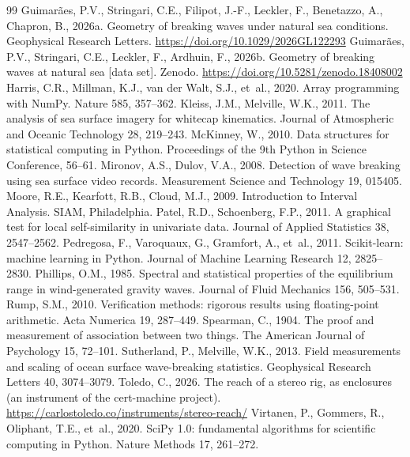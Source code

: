 \documentclass[preprint,11pt,authoryear]{elsarticle}
\begin{document}
\begin{thebibliography}{99}
 Guimar\~aes, P.V., Stringari, C.E., Filipot, J.-F., Leckler, F., Benetazzo, A., Chapron, B., 2026a. Geometry of breaking waves under natural sea conditions. Geophysical Research Letters. \url{https://doi.org/10.1029/2026GL122293}
 Guimar\~aes, P.V., Stringari, C.E., Leckler, F., Ardhuin, F., 2026b. Geometry of breaking waves at natural sea [data set]. Zenodo. \url{https://doi.org/10.5281/zenodo.18408002}
 Harris, C.R., Millman, K.J., van der Walt, S.J., et~al., 2020. Array programming with NumPy. Nature 585, 357--362.
 Kleiss, J.M., Melville, W.K., 2011. The analysis of sea surface imagery for whitecap kinematics. Journal of Atmospheric and Oceanic Technology 28, 219--243.
 McKinney, W., 2010. Data structures for statistical computing in Python. Proceedings of the 9th Python in Science Conference, 56--61.
 Mironov, A.S., Dulov, V.A., 2008. Detection of wave breaking using sea surface video records. Measurement Science and Technology 19, 015405.
 Moore, R.E., Kearfott, R.B., Cloud, M.J., 2009. Introduction to Interval Analysis. SIAM, Philadelphia.
 Patel, R.D., Schoenberg, F.P., 2011. A graphical test for local self-similarity in univariate data. Journal of Applied Statistics 38, 2547--2562.
 Pedregosa, F., Varoquaux, G., Gramfort, A., et~al., 2011. Scikit-learn: machine learning in Python. Journal of Machine Learning Research 12, 2825--2830.
 Phillips, O.M., 1985. Spectral and statistical properties of the equilibrium range in wind-generated gravity waves. Journal of Fluid Mechanics 156, 505--531.
 Rump, S.M., 2010. Verification methods: rigorous results using floating-point arithmetic. Acta Numerica 19, 287--449.
 Spearman, C., 1904. The proof and measurement of association between two things. The American Journal of Psychology 15, 72--101.
 Sutherland, P., Melville, W.K., 2013. Field measurements and scaling of ocean surface wave-breaking statistics. Geophysical Research Letters 40, 3074--3079.
 Toledo, C., 2026. The reach of a stereo rig, as enclosures (an instrument of the cert-machine project). \url{https://carlostoledo.co/instruments/stereo-reach/}
 Virtanen, P., Gommers, R., Oliphant, T.E., et~al., 2020. SciPy 1.0: fundamental algorithms for scientific computing in Python. Nature Methods 17, 261--272.
\end{thebibliography}
\end{document}
